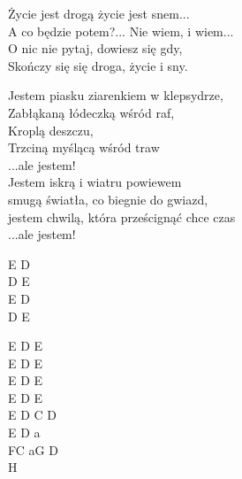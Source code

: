 \begin{text}
\begin{scriptTwelve}
    Życie jest drogą życie jest snem...\\
    A co będzie potem?... Nie wiem, i wiem...\\
    O nic nie pytaj, dowiesz się gdy,\\
    Skończy się się droga, życie i sny.

    \vin Jestem piasku ziarenkiem w klepsydrze,\\
    \vin Zabłąkaną łódeczką wśród raf,\\
    \vin Kroplą deszczu,\\
    \vin Trzciną myślącą wśród traw\\
    \vin ...ale jestem!\\
    \vin Jestem iskrą i wiatru powiewem\\
    \vin smugą światła, co biegnie do gwiazd,\\
    \vin jestem chwilą, która prześcignąć chce czas\\
    \vin ...ale jestem!
\end{scriptTwelve}
\end{text}
\begin{chord}
    \begin{scriptTwelve}
E D\\
D E\\
E D\\
D E

E D E\\
E D E\\
E D E\\
E D E\\
E D C D\\
E D a\\
FC aG D\\
H
\end{scriptTwelve}
\end{chord}